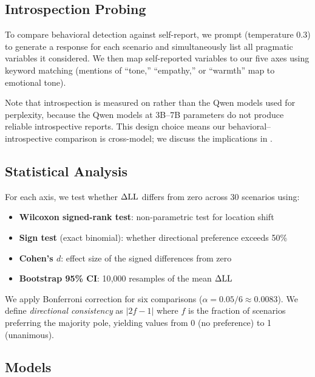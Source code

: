 \subsection{Introspection Probing}
\label{sec:introspection}

To compare behavioral detection against self-report, we prompt \gptfour (temperature 0.3) to generate a response for each scenario and simultaneously list all pragmatic variables it considered. We then map self-reported variables to our five axes using keyword matching (\eg mentions of ``tone,'' ``empathy,'' or ``warmth'' map to emotional tone).

Note that introspection is measured on \gptfour rather than the Qwen models used for perplexity, because the Qwen models at 3B--7B parameters do not produce reliable introspective reports. This design choice means our behavioral--introspective comparison is cross-model; we discuss the implications in .

\subsection{Statistical Analysis}
\label{sec:stats}

For each axis, we test whether $\Delta\mathrm{LL}$ differs from zero across 30 scenarios using:
\begin{itemize}[leftmargin=*,itemsep=0pt,topsep=0pt]
    \item \textbf{Wilcoxon signed-rank test}: non-parametric test for location shift
    \item \textbf{Sign test} (exact binomial): whether directional preference exceeds 50\%
    \item \textbf{Cohen's $d$}: effect size of the signed differences from zero
    \item \textbf{Bootstrap 95\% CI}: 10{,}000 resamples of the mean $\Delta\mathrm{LL}$
\end{itemize}

We apply Bonferroni correction for six comparisons ($\alpha = 0.05/6 \approx 0.0083$). We define \emph{directional consistency} as $|2f - 1|$ where $f$ is the fraction of scenarios preferring the majority pole, yielding values from 0 (no preference) to 1 (unanimous).

\subsection{Models}
\label{sec:models}

